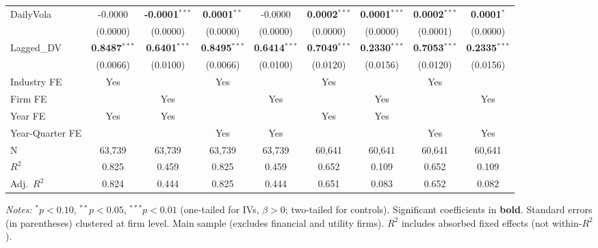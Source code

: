\begin{landscape}
\begin{table}[H]
\begin{tabular}{lcccccccc}
DailyVola & -0.0000 & \textbf{-0.0001}$^{***}$ & \textbf{0.0001}$^{**}$ & -0.0000 & \textbf{0.0002}$^{***}$ & \textbf{0.0001}$^{***}$ & \textbf{0.0002}$^{***}$ & \textbf{0.0001}$^{*}$ \\
 & (0.0000) & (0.0000) & (0.0000) & (0.0000) & (0.0000) & (0.0000) & (0.0001) & (0.0000) \\
Lagged\_DV & \textbf{0.8487}$^{***}$ & \textbf{0.6401}$^{***}$ & \textbf{0.8495}$^{***}$ & \textbf{0.6414}$^{***}$ & \textbf{0.7049}$^{***}$ & \textbf{0.2330}$^{***}$ & \textbf{0.7053}$^{***}$ & \textbf{0.2335}$^{***}$ \\
 & (0.0066) & (0.0100) & (0.0066) & (0.0100) & (0.0120) & (0.0156) & (0.0120) & (0.0156) \\
\midrule
Industry FE & Yes &  & Yes &  & Yes &  & Yes &  \\
Firm FE &  & Yes &  & Yes &  & Yes &  & Yes \\
Year FE & Yes & Yes &  &  & Yes & Yes &  &  \\
Year-Quarter FE &  &  & Yes & Yes &  &  & Yes & Yes \\
\midrule
N & 63,739 & 63,739 & 63,739 & 63,739 & 60,641 & 60,641 & 60,641 & 60,641 \\
$R^2$ & 0.825 & 0.459 & 0.825 & 0.459 & 0.652 & 0.109 & 0.652 & 0.109 \\
Adj.~$R^2$ & 0.824 & 0.444 & 0.825 & 0.444 & 0.651 & 0.083 & 0.652 & 0.082 \\
\bottomrule
\end{tabular}
\begin{minipage}{\linewidth}
\vspace{2pt}\scriptsize
\textit{Notes:} $^{*}p<0.10$, $^{**}p<0.05$, $^{***}p<0.01$ (one-tailed for IVs, $\beta > 0$; two-tailed for controls).
 Significant coefficients in \textbf{bold}.
 Standard errors (in parentheses) clustered at firm level.
 Main sample (excludes financial and utility firms).
 $R^2$ includes absorbed fixed effects (not within-$R^2$).
\end{minipage}
\end{table}
\end{landscape}